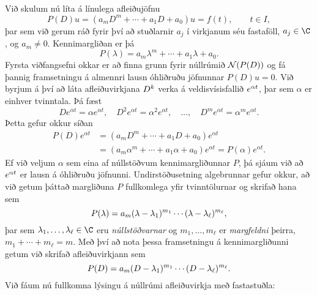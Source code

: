 \noindent
Við skulum nú líta á línulega afleiðujöfnu
 \begin{equation*}P(D)u = (a_mD^m+\cdots+a_1D+a_0)u
=f(t), \qquad t\in I,\label{2.2.1}
 \end{equation*}
þar sem við gerum ráð fyrir því að stuðlarnir $a_j$ í virkjanum séu
fastaföll, $a_j\in \C$, og $a_m\neq 0$.
Kennimargliðan
 er þá 
\begin{equation*}
P(\lambda)=a_m\lambda^m+\cdots+a_1\lambda+a_0.\label{2.2.2}
\end{equation*}
Fyrsta viðfangsefni okkar  er að finna grunn fyrir núllrúmið 
${\cal N}(P(D))$ og fá 
þannig framsetningu á almennri lausn
óhliðruðu jöfnunnar $P(D)u=0$. Við
byrjum á því að láta afleiðuvirkjana
$D\sp k$ verka á veldisvísisfallið $e\sp{\alpha t}$, þar sem $\alpha$
er einhver tvinntala. Þá fæst
$$
De^{\alpha t}=\alpha e^{\alpha t},\quad
D^2e^{\alpha t}=\alpha^2 e^{\alpha t},\quad
\dots , \quad 
D^me^{\alpha t}=\alpha^m e^{\alpha t}.
$$ 
Þetta gefur okkur síðan 
\begin{align*}\label{2.2.3}
P(D)e^{\alpha t}&=(a_mD^m+\cdots+a_1D+a_0)e^{\alpha t} \\
&=(a_m{\alpha}^m+\cdots+a_1{\alpha}+a_0)e^{\alpha
t}=P(\alpha)e^{\alpha t}.\nonumber
\end{align*}
Ef við veljum $\alpha$ sem eina af núllstöðvum kennimargliðunnar $P$,
þá sjáum við að $e\sp{\alpha t}$ er lausn á óhliðruðu jöfnunni.
Undirstöðusetning algebrunnar gefur okkur, að við getum þáttað
margliðuna $P$ fullkomlega yfir tvinntölurnar og skrifað hana sem
 \begin{equation*}P(\lambda)=a_m(\lambda-\lambda_1)\sp{m_1}\cdots
(\lambda-\lambda_\ell)\sp{m_\ell},\label{2.2.4}
 \end{equation*}
þar sem $\lambda_1,\dots,\lambda_\ell\in \C$ eru {\it
núllstöðvarnar}
og $m_1,\dots,m_\ell$ er {\it
margfeldni} þeirra, $m_1+\cdots+m_\ell=m$.
Með því að nota þessa framsetningu á kennimargliðunni getum við skrifað
afleiðuvirkjann sem 
 \begin{equation*}P(D)=a_m(D-\lambda_1)\sp{m_1}\cdots(D-\lambda_\ell)\sp{m_\ell}.\label{2.2.5}
 \end{equation*}
Við fáum nú fullkomna lýsingu á núllrúmi afleiðuvirkja með fastastuðla:

